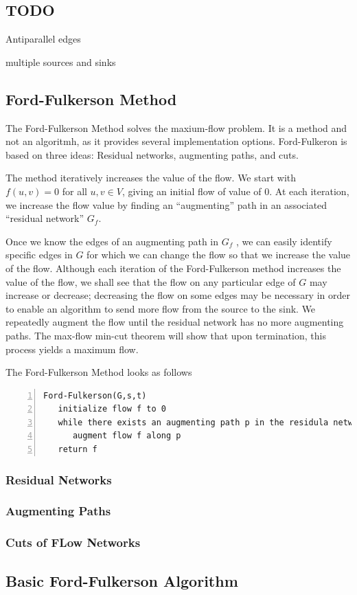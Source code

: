\subsection{TODO}

Antiparallel edges

multiple sources and sinks

\subsection{Ford-Fulkerson Method}

The Ford-Fulkerson Method solves the maxium-flow problem. It is a method and not an algoritmh, as it provides several implementation options. Ford-Fulkeron is based on three ideas: Residual networks, augmenting paths, and cuts.

The method iteratively increases the value of the flow. We start with $f(u,v)=0$ for all $u,v \in V$, giving an initial flow of value of $0$. At each iteration, we increase the flow value by finding an ``augmenting'' path in an associated ``residual network'' $G_f$.

Once we know the edges of an augmenting path in $G_f$ , we can easily identify speciﬁc edges in $G$ for which we can change the ﬂow so that we increase the value of the ﬂow. Although each iteration of the Ford-Fulkerson method increases the value of the ﬂow, we shall see that the ﬂow on any particular edge of $G$ may increase or decrease; decreasing the ﬂow on some edges may be necessary in order to enable an algorithm to send more ﬂow from the source to the sink. We repeatedly augment the ﬂow until the residual network has no more augmenting paths. The max-ﬂow min-cut theorem will show that upon termination, this process yields a maximum ﬂow.

The Ford-Fulkerson Method looks as follows

\begin{Verbatim}[numbers=left, xleftmargin=5mm]
Ford-Fulkerson(G,s,t)
   initialize flow f to 0
   while there exists an augmenting path p in the residula network G_f
      augment flow f along p
   return f
\end{Verbatim}


\subsubsection{Residual Networks}

\subsubsection{Augmenting Paths}

\subsubsection{Cuts of FLow Networks}

\subsection{Basic Ford-Fulkerson Algorithm}




